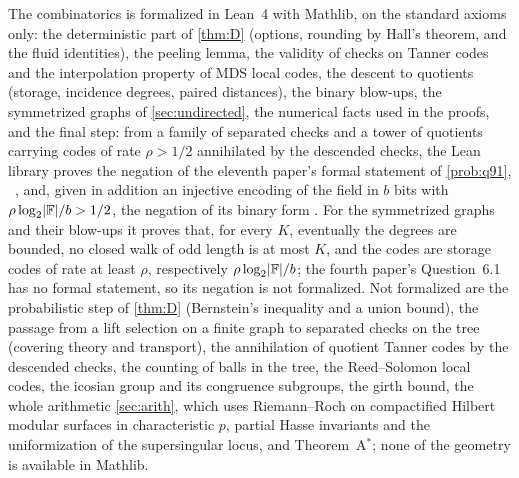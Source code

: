 The combinatorics is formalized in Lean~4 with Mathlib, on the standard axioms only: the deterministic part of
\cref{thm:D} (options, rounding by Hall's theorem, and the fluid identities), the peeling lemma, the validity of checks on
Tanner codes and the interpolation property of MDS local codes, the descent to quotients (storage, incidence degrees,
paired distances), the binary blow-ups, the symmetrized graphs of \cref{sec:undirected}, the numerical facts used in the
proofs, and the final step: from a family of separated checks and a tower of quotients carrying codes of rate $\rho>1/2$
annihilated by the descended checks, the Lean library proves the negation of the eleventh paper's formal statement of
\cref{prob:q91}, ~\cite{MergeDepth2026}, and, given in addition an injective encoding of the field
in $b$ bits with $\rho\log_2\lvert \mathbb{F} \rvert/b>1/2$, the negation of its binary form . For the
symmetrized graphs and their blow-ups it proves that, for every $K$, eventually the degrees are bounded, no closed walk of
odd length is at most $K$, and the codes are storage codes of rate at least $\rho$, respectively $\rho\log_2\lvert \mathbb{F} \rvert/b$;
the fourth paper's Question~6.1 has no formal statement, so its negation is not formalized. Not formalized are the probabilistic step of \cref{thm:D}
(Bernstein's inequality and a union bound), the passage from a lift selection on a finite graph to separated checks on
the tree (covering theory and transport), the annihilation of quotient Tanner codes by the descended checks, the
counting of balls in the tree, the Reed--Solomon local codes, the icosian group and its congruence subgroups, the girth
bound, the whole arithmetic \cref{sec:arith}, which uses Riemann--Roch on compactified Hilbert modular surfaces in
characteristic $p$, partial Hasse invariants and the uniformization of the supersingular locus, and Theorem~A$^*$;
none of the geometry is available in Mathlib.


